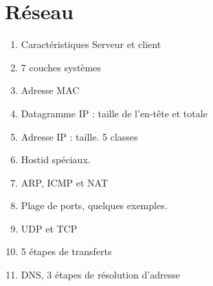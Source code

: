 \documentclass[11pt, twocolumn, landscape]{article}
\begin{document}
\part{Réseau}
\begin{enumerate}
	\item Caractéristiques Serveur et client
	\item 7 couches systèmes
	\item Adresse MAC
	\item Datagramme IP : taille de l'en-tête et totale
	\item Adresse IP : taille. 5 classes
	\item Hostid spéciaux.
	\item ARP, ICMP et NAT
	\item Plage de ports, quelques exemples. 
	\item UDP et TCP
	\item 5 étapes de transferts
	\item DNS, 3 étapes de résolution d'adresse
\end{enumerate}
\end{document}
